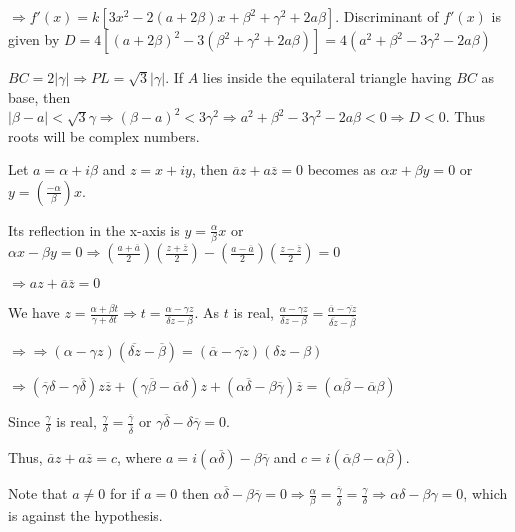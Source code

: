   $\Rightarrow f'(x) = k[3x^2 - 2(a + 2\beta)x + \beta^2 + \gamma^2 + 2a\beta]$. Discriminant of $f'(x)$ is
  given by $D = 4[(a + 2\beta)^2 - 3(\beta^2 + \gamma^2 + 2a\beta)] = 4(a^2 + \beta^2 - 3\gamma^2 -
  2a\beta)$

  $BC = 2|\gamma| \Rightarrow PL = \sqrt{3}|\gamma|$. If $A$ lies inside the equilateral triangle having
  $BC$ as base, then $|\beta - a|< \sqrt{3}\gamma \Rightarrow (\beta - a)^2 < 3\gamma^2 \Rightarrow a^2 +
  \beta^2 - 3\gamma^2 - 2a\beta < 0 \Rightarrow D < 0$. Thus roots will be complex numbers.
\item Let $a = \alpha + i\beta$ and $z = x + iy$, then $\overline{a}z + a\overline{z} = 0$ becomes as
  $\alpha x + \beta y = 0$ or $y = \left(\frac{-\alpha}{\beta}\right)x$.

  Its reflection in the x-axis is $y = \frac{\alpha}{\beta}x$ or $\alpha x - \beta y = 0 \Rightarrow
  \left(\frac{a + \overline{a}}{2}\right)\left(\frac{z + \overline{z}}{2}\right) - \left(\frac{a -
    \overline{a}}{2}\right)\left(\frac{z -\overline{z}}{2}\right) = 0$

  $\Rightarrow az + \overline{a}\overline{z} = 0$
\item We have $z = \frac{\alpha + \beta t}{\gamma + \delta t} \Rightarrow t = \frac{\alpha - \gamma
  z}{\delta z - \beta}$. As $t$ is real, $\frac{\alpha - \gamma z}{\delta z - \beta} =
  \frac{\overline{\alpha} - \overline{\gamma z}}{\overline{\delta z} - \overline{\beta}}$

  $\Rightarrow \Rightarrow (\alpha - \gamma z)(\overline{\delta z} - \overline{\beta}) = (\overline{\alpha}
  - \overline{\gamma z})(\delta z - \beta)$

  $\Rightarrow (\overline{\gamma}\delta - \gamma\overline{\delta})z\overline{z} +
  (\gamma\overline{\beta}-\overline{\alpha}\delta)z +(\alpha\overline{\delta} -
  \beta\overline{\gamma})\overline{z} = (\alpha\overline{\beta} - \overline{\alpha}\beta)$

  Since $\frac{\gamma}{\delta}$ is real, $\frac{\gamma}{\delta} =
  \frac{\overline{\gamma}}{\overline{\delta}}$ or $\gamma\overline{\delta} - \delta\overline{\gamma} = 0$.

  Thus, $\overline{a}z + a\overline{z} = c$, where $a = i(\alpha\overline{\delta}) - \beta\overline{\gamma}$
  and $c = i(\overline{\alpha}\beta - \alpha\overline{\beta})$.

  Note that $a \ne 0$ for if $a = 0$ then $\alpha\overline{\delta} - \beta\overline{\gamma} = 0\Rightarrow
  \frac{\alpha}{\beta} = \frac{\overline{\gamma}}{\overline{\delta}} = \frac{\gamma}{\delta}\Rightarrow
  \alpha\delta - \beta\gamma = 0$, which is against the hypothesis.

